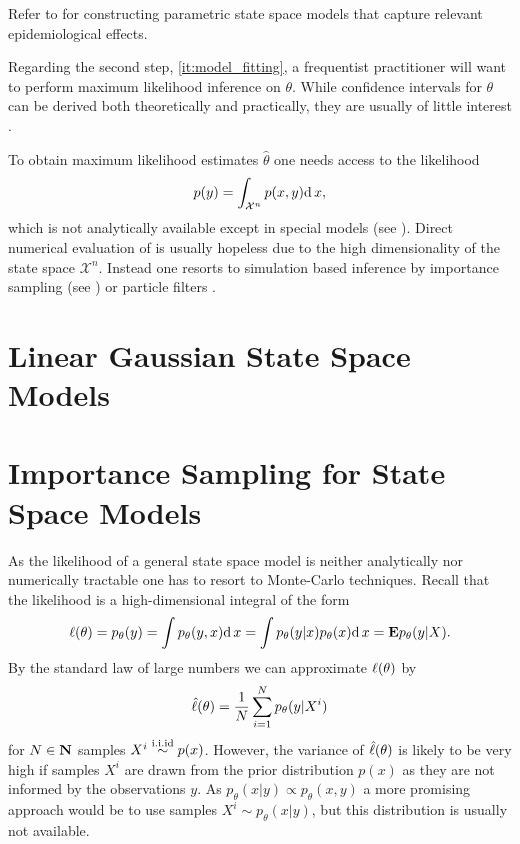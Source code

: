 Refer to  for constructing parametric state space models that capture relevant epidemiological effects.

Regarding the second step, \cref{it:model_fitting}, a frequentist practitioner will want to perform maximum likelihood inference on $\theta$.
While confidence intervals for $\theta$ can be derived both theoretically and practically, they are usually of little interest .

To obtain maximum likelihood estimates $\hat\theta$ one needs access to the likelihood 
\begin{align}
    \label{eq:likelihood}
    p(y) = \int_{\mathcal X^n} p(x,y) \mathrm d\, x,
\end{align}
which is not analytically available except in special models (see ).
Direct numerical evaluation of  is usually hopeless due to the high dimensionality of the state space $\mathcal X^n$. 
Instead one resorts to simulation based inference by importance sampling (see ) or particle filters .

\section{Linear Gaussian State Space Models}
\label{sec:lgssm}

\section{Importance Sampling for State Space Models}
\label{sec:is_for_ssm}

As the likelihood of a general state space model is neither analytically nor numerically tractable one has to resort to Monte-Carlo techniques.
Recall that the likelihood is a high-dimensional integral of the form
\begin{align*}
    \ell(\theta) = p_\theta(y) = \int p_\theta(y,x) \mathrm d\, x = \int p_\theta(y|x) p_\theta(x) \mathrm d\, x = \mathbf E p_\theta(y|X).
\end{align*}
By the standard law of large numbers we can approximate $\ell(\theta)$ by 
\begin{align*}
  \hat{\ell}(\theta) = \frac 1 N \sum_{i=1}^N p_\theta(y|X^i)  
\end{align*}
for $N\in\mathbf N$ samples $X^i \stackrel{\text{i.i.id}}{\sim} p(x)$. 
However, the variance of $\hat{\ell}(\theta)$ is likely to be very high if samples $X^i$ are drawn from the prior distribution $p(x)$ as they are not informed by the observations $y$. 
As $p_\theta(x|y) \propto p_\theta(x,y)$ a more promising approach would be to use samples $X^i \sim p_\theta(x|y)$, but this distribution is usually not available. 

